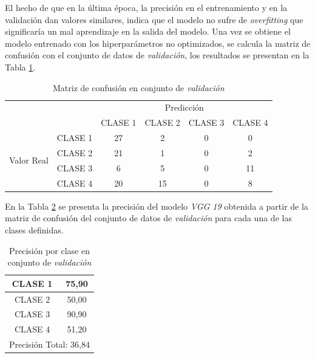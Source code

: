 \vspace{0.5cm}

El hecho de que en la última época, la precisión en el entrenamiento y en la validación dan valores similares, indica que el modelo no sufre de \textit{overfitting} que significaría un mal aprendizaje en la salida del modelo. Una vez se obtiene el modelo entrenado con los hiperparámetros no optimizados, se calcula la matriz de confusión con el conjunto de datos de \textit{validación}, los resultados se presentan en la Tabla \ref{fig:MC_VGG19}.

\vspace{0.5cm}

\begin{table}[htbp]
	\centering
	\resizebox{12cm}{!} {
	\begin{tabular}{|c|l|c|c|c|c|}
		\hline
		\multicolumn{2}{|c|}{\multirow{2}[4]{*}{}} & \multicolumn{4}{c|}{Predicción} \bigstrut\\
		\cline{3-6}    \multicolumn{2}{|c|}{} & CLASE 1 & CLASE 2 & CLASE 3 & CLASE 4 \bigstrut\\
		\hline
		\multirow{4}[8]{*}{\begin{sideways}Valor Real\end{sideways}} & CLASE 1 & 27     & 2     & 0    & 0 \bigstrut\\
		\cline{2-6}     & CLASE 2 & 21     & 1     & 0    & 2 \bigstrut\\
		\cline{2-6}      & CLASE 3 & 6     & 5     & 0    & 11 \bigstrut\\
		\cline{2-6}     & CLASE 4 & 20     & 15     & 0    & 8 \bigstrut\\
		\hline
	\end{tabular}
	}
	\caption{Matriz de confusión en conjunto de \textit{validación}}
	\label{fig:MC_VGG19}
\end{table}

\newpage

En la Tabla \ref{fig:ACU_VGG19} se presenta la precisión del modelo \textit{VGG 19} obtenida a partir de la matriz de confusión del conjunto de datos de \textit{validación} para cada una de las clases definidas.

\begin{table}[htbp]
	\centering
	\begin{tabular}{|c|c|}
		\hline
		CLASE 1 & 75,90 \bigstrut\\
		\hline
		CLASE 2 & 50,00 \bigstrut\\
		\hline
		CLASE 3 & 90,90 \bigstrut\\
		\hline
		CLASE 4 & 51,20 \bigstrut\\
		\hline
		\multicolumn{2}{|c|}{Precisión Total: 36,84} \bigstrut\\
		\hline
	\end{tabular}%
	\caption{Precisión por clase en conjunto de \textit{validación}}
	\label{fig:ACU_VGG19}
\end{table}%

